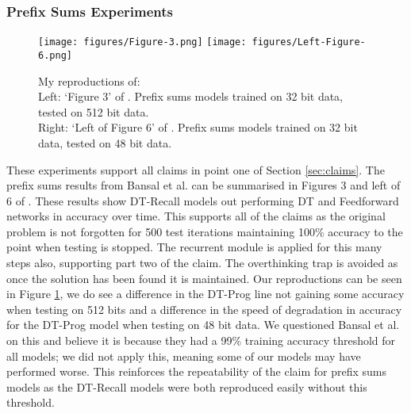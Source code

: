 \subsubsection{Prefix Sums Experiments}
\begin{figure}[h]
    \texttt{[image: figures/Figure-3.png]}\hfill
    \texttt{[image: figures/Left-Figure-6.png]}
    \\[\smallskipamount]
    \caption{My reproductions of:\\
    Left: `Figure 3' of \cite{bansal2022endtoend}. Prefix sums models trained on 32 bit data, tested on 512 bit data.\\
    Right: `Left of Figure 6' of \cite{bansal2022endtoend}. Prefix sums models trained on 32 bit data, tested on 48 bit data.}
    \label{figs:sums}
\end{figure}
These experiments support all claims in point one of Section \ref{sec:claims}. The prefix sums results from Bansal et al. can be summarised in Figures 3 and left of 6 of \cite{bansal2022endtoend}. These results show DT-Recall models out performing DT and Feedforward networks in accuracy over time. This supports all of the claims as the original problem is not forgotten for 500 test iterations maintaining 100\% accuracy to the point when testing is stopped. The recurrent module is applied for this many steps also, supporting part two of the claim. The overthinking trap is avoided as once the solution has been found it is maintained. Our reproductions can be seen in Figure \ref{figs:sums}, we do see a difference in the DT-Prog line not gaining some accuracy when testing on 512 bits and a difference in the speed of degradation in accuracy for the DT-Prog model when testing on 48 bit data. We questioned Bansal et al. on this and believe it is because they had a 99\% training accuracy threshold for all models; we did not apply this, meaning some of our models may have performed worse.  This reinforces the repeatability of the claim for prefix sums models as the DT-Recall models were both reproduced easily without this threshold.

